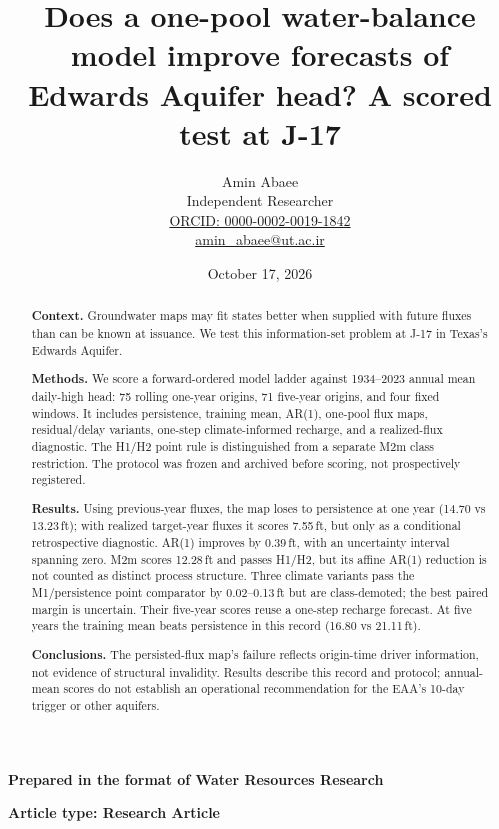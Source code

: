 \documentclass[11pt]{article}
\begin{document}
\title{Does a one-pool water-balance model improve forecasts of Edwards Aquifer head? A scored test at J-17}
\author{Amin Abaee\\[0.35em]
{\small Independent Researcher}\\[0.55em]
{\small\href{https://orcid.org/0000-0002-0019-1842}{ORCID: 0000-0002-0019-1842}}\\[0.3em]
{\small\href{mailto:amin\_abaee@ut.ac.ir}{amin\_abaee@ut.ac.ir}}}
\date{October 17, 2026}
\maketitle

{\centering\small \textbf{Prepared in the format of Water Resources Research}\par}
{\centering\small \textbf{Article type: Research Article}\par}

\begin{abstract}
\textbf{Context.} Groundwater maps may fit states better when supplied with future fluxes than can be known at issuance. We test this information-set problem at J-17 in Texas's Edwards Aquifer.

\textbf{Methods.} We score a forward-ordered model ladder against 1934--2023 annual mean daily-high head: 75 rolling one-year origins, 71 five-year origins, and four fixed windows. It includes persistence, training mean, AR(1), one-pool flux maps, residual/delay variants, one-step climate-informed recharge, and a realized-flux diagnostic. The H1/H2 point rule is distinguished from a separate M2m class restriction. The protocol was frozen and archived before scoring, not prospectively registered.

\textbf{Results.} Using previous-year fluxes, the map loses to persistence at one year (14.70 vs 13.23\,ft); with realized target-year fluxes it scores 7.55\,ft, but only as a conditional retrospective diagnostic. AR(1) improves by 0.39\,ft, with an uncertainty interval spanning zero. M2m scores 12.28\,ft and passes H1/H2, but its affine AR(1) reduction is not counted as distinct process structure. Three climate variants pass the M1/persistence point comparator by 0.02--0.13\,ft but are class-demoted; the best paired margin is uncertain. Their five-year scores reuse a one-step recharge forecast. At five years the training mean beats persistence in this record (16.80 vs 21.11\,ft).

\textbf{Conclusions.} The persisted-flux map's failure reflects origin-time driver information, not evidence of structural invalidity. Results describe this record and protocol; annual-mean scores do not establish an operational recommendation for the EAA's 10-day trigger or other aquifers.
\end{abstract}
\end{document}
